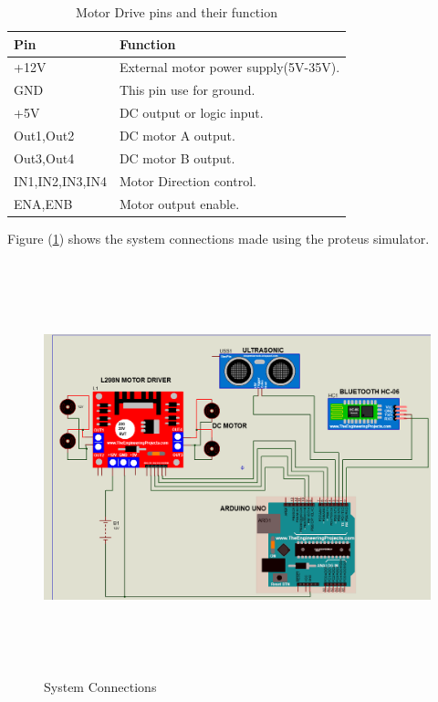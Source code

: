 \documentclass[12pt,a4paper]{report}
\begin{document}
\begin{table}[H]
\begin{center}
\caption{Motor Drive pins and their function}
\label{tab:Table1}  
\begin{tabular}{|p{3cm}|p{11cm}|}
\hline
\textbf{Pin} & \textbf{Function}\\
\hline
+12V 	&External motor power supply(5V-35V).\\\hline

GND &This pin use for ground.\\\hline

+5V	&DC output or logic input.\\\hline
Out1,Out2 	&DC motor A output. \\\hline 
Out3,Out4 	&DC motor B output. \\\hline 

IN1,IN2,IN3,IN4	&Motor Direction control. \\\hline 
ENA,ENB	&Motor output enable.\\\hline 

\end{tabular}
\end{center}  
\end{table}
\newpage

Figure (\ref{fig:Connections}) shows the system connections made using the proteus simulator.
\begin{figure}[H]
    \centering
    \graphicspath{ {./images/} }
    \includegraphics [width=1\textwidth,height=12cm]{Connictions.PNG}
    \caption{System Connections}
    \label{fig:Connections}
\end{figure}
\end{document}
